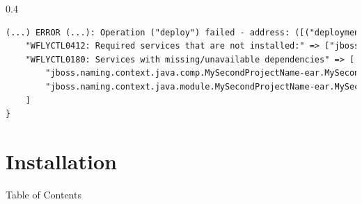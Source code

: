 \documentclass[aspectratio=1610,english]{beamer} %
\begin{document}
	\begin{lrbox}{\DebugStandaloneFullHAErrorBox}
		\begin{varwidth}{0.4\textwidth}
			\fontsize{3}{4} \selectfont	
				\begin{lstlisting}[style=myCustomStyle, language=XML,
  					morekeywords={},
    				basicstyle=\ttfamily,
					columns=fullflexible,
					showstringspaces=false,
					commentstyle=\color{gray}\upshape, 
					belowskip=-15pt,
					aboveskip=0pt ]
(...) ERROR (...): Operation ("deploy") failed - address: ([("deployment" => "MySecondProjectName-ear.ear")]) - failure description: {
    "WFLYCTL0412: Required services that are not installed:" => ["jboss.naming.context.java.jboss.DefaultJMSConnectionFactory"],
    "WFLYCTL0180: Services with missing/unavailable dependencies" => [
        "jboss.naming.context.java.comp.MySecondProjectName-ear.MySecondProjectName-ejb.MySecondEjbNameEJB.DefaultJMSConnectionFactory is missing [jboss.naming.context.java.jboss.DefaultJMSConnectionFactory]",
        "jboss.naming.context.java.module.MySecondProjectName-ear.MySecondProjectName-web.DefaultJMSConnectionFactory is missing [jboss.naming.context.java.jboss.DefaultJMSConnectionFactory]"
    ]
}						\end{lstlisting}
		\end{varwidth}
	\end{lrbox}

  	\maketitle

  	\part{Installation}
  	\begin{frame}{Table of Contents}
  		\tableofcontents
  	\end{frame}
\end{document}
